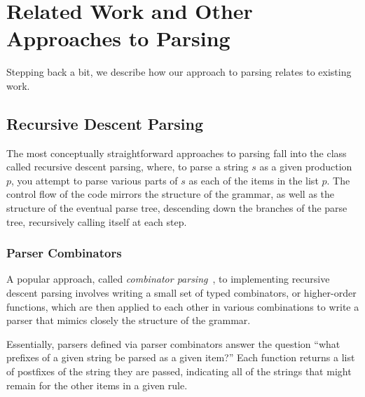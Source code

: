 \chapter{Related Work and Other Approaches to Parsing} \label{sec:related}

  Stepping back a bit, we describe how our approach to parsing relates to existing work.
  
  
  \section{Recursive Descent Parsing}
    The most conceptually straightforward approaches to parsing fall into the class called recursive descent parsing, where, to parse a string $s$ as a given production $p$, you attempt to parse various parts of $s$ as each of the items in the list $p$.  The control flow of the code mirrors the structure of the grammar, as well as the structure of the eventual parse tree, descending down the branches of the parse tree, recursively calling itself at each step.
    
    \subsection{Parser Combinators}
      A popular approach, called \emph{combinator parsing}~\cite{pcomb}, to implementing recursive descent parsing involves writing a small set of typed combinators, or higher-order functions, which are then applied to each other in various combinations to write a parser that mimics closely the structure of the grammar.
      
      Essentially, parsers defined via parser combinators answer the question ``what prefixes of a given string be parsed as a given item?''  Each function returns a list of postfixes of the string they are passed, indicating all of the strings that might remain for the other items in a given rule.  
      

